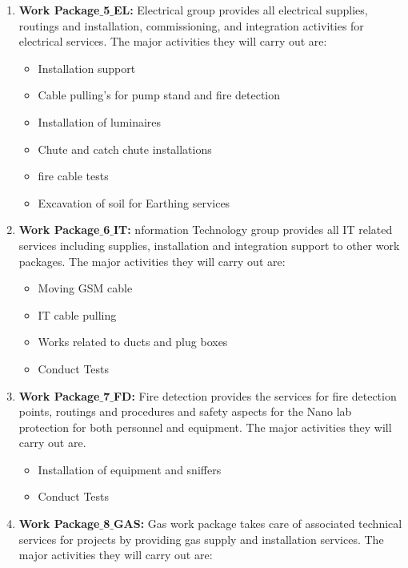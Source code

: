 \begin{enumerate}
\begin{itemize}
	\end{itemize}
	
	\item \textbf{Work Package$\_$5$\_$EL:} Electrical group provides all electrical supplies, routings and installation, commissioning, and integration activities for electrical services.
	The major activities they will carry out are:
	\begin{itemize}
		\item Installation support
		\item Cable pulling’s for pump stand and fire detection
		\item Installation of luminaires
		\item Chute and catch chute installations
		\item fire cable tests
		\item Excavation of soil for Earthing services	
	\end{itemize}
	
	\item \textbf{Work Package$\_$6$\_$IT:} nformation Technology group provides all IT related services including supplies, installation and integration support to other work packages.
	The major activities they will carry out are: 
	
	\begin{itemize}
		\item Moving GSM cable
		\item IT cable pulling
		\item 	Works related to ducts and plug boxes
		\item Conduct Tests

	\end{itemize}
	
	\item \textbf{Work Package$\_$7$\_$FD:} Fire detection provides the services for fire detection points, routings and procedures and safety aspects for the Nano lab protection for both personnel and equipment.
	The major activities they will carry out are.
	
	\begin{itemize}
		\item Installation of equipment and sniffers
		\item Conduct Tests
	\end{itemize}
	
	\item \textbf{Work Package$\_$8$\_$GAS:} Gas work package takes care of associated technical services for projects by providing gas supply and installation services.
	The major activities they will carry out are:
	

\end{enumerate}
